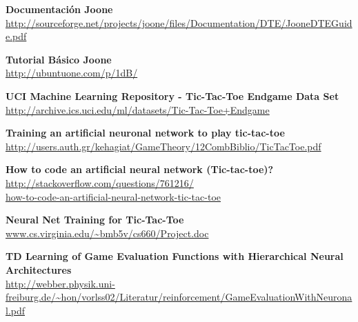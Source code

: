 \documentclass[12pt,titlepage]{article}
\begin{document}
\newpage
\begin{thebibliography}{99}
		\textbf{Documentaci\'on Joone} \\
		\url{http://sourceforge.net/projects/joone/files/Documentation/DTE/JooneDTEGuide.pdf}

		\textbf{Tutorial B\'asico Joone} \\
		\url{http://ubuntuone.com/p/1dB/}

		\textbf{UCI Machine Learning Repository - Tic-Tac-Toe Endgame Data Set} \\
		\url{http://archive.ics.uci.edu/ml/datasets/Tic-Tac-Toe+Endgame}

		\textbf{Training an artificial neuronal network to play tic-tac-toe} \\
		\url{http://users.auth.gr/kehagiat/GameTheory/12CombBiblio/TicTacToe.pdf}

		\textbf{How to code an artificial neural network (Tic-tac-toe)?} \\
		\url{http://stackoverflow.com/questions/761216/} \\
		\url{how-to-code-an-artificial-neural-network-tic-tac-toe}

		\textbf{Neural Net Training for Tic-Tac-Toe} \\
		\url{www.cs.virginia.edu/~bmb5v/cs660/Project.doc}

		\textbf{TD Learning of Game Evaluation Functions with Hierarchical Neural Architectures} \\
		\url{http://webber.physik.uni-freiburg.de/~hon/vorlss02/Literatur/reinforcement/GameEvaluationWithNeuronal.pdf}

\end{thebibliography}


\end{document}
